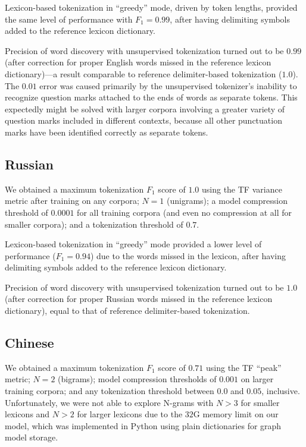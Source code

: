 \documentclass[11pt]{article}
\begin{document}
Lexicon-based tokenization in “greedy” mode, driven by token lengths, provided the same level of performance with $F_1=0.99$, after having delimiting symbols added to the reference lexicon dictionary.  

Precision of word discovery with unsupervised tokenization turned out to be $0.99$ (after correction for proper English words missed in the reference lexicon dictionary)—a result comparable to reference delimiter-based tokenization ($1.0$). The $0.01$ error was caused primarily by the unsupervised tokenizer’s inability to recognize question marks attached to the ends of words as separate tokens. This expectedly might be solved with larger corpora involving a greater variety of question marks included in different contexts, because all other punctuation marks have been identified correctly as separate tokens.   

\subsection{\label{42}Russian}

We obtained a maximum tokenization $F_1$ score of $1.0$ using the TF variance metric after training on any corpora; $N=1$ (unigrams); a model compression threshold of $0.0001$ for all training corpora (and even no compression at all for smaller corpora); and a tokenization threshold of $0.7$.

Lexicon-based tokenization in “greedy” mode provided a lower level of performance ($F_1=0.94$) due to the words missed in the lexicon, after having delimiting symbols added to the reference lexicon dictionary.  

Precision of word discovery with unsupervised tokenization turned out to be $1.0$ (after correction for proper Russian words missed in the reference lexicon dictionary), equal to that of reference delimiter-based tokenization.

\subsection{\label{43}Chinese}

We obtained a maximum tokenization $F_1$ score of $0.71$ using the TF “peak” metric; $N=2$ (bigrams); model compression thresholds of $0.001$ on larger training corpora; and any tokenization threshold between $0.0$ and $0.05$, inclusive. Unfortunately, we were not able to explore N-grams with $N > 3$ for smaller lexicons and $N>2$ for larger lexicons due to the $32$G memory limit on our model, which was implemented in Python using plain dictionaries for graph model storage. 
\end{document}
